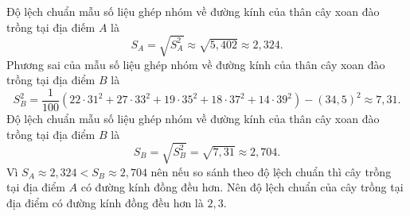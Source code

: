 \begin{ex}
{$$		$$
		Độ lệch chuẩn mẫu số liệu ghép nhóm về đường kính của thân cây xoan đào trồng tại địa điếm $A$ là
		$$
		S_A=\sqrt{S_A^2} \approx \sqrt{5{,}402} \approx 2{,}324.
		$$
		Phương sai của mẫu số liệu ghép nhóm về đường kính của thân cây xoan đào trồng tại địa điểm $B$ là
		$$
		S_B^2=\dfrac{1}{100}\left(22 \cdot 31^2+27 \cdot 33^2+19\cdot 35^2+18 \cdot 37^2+14\cdot 39^2\right)-(34{,}5)^2 \approx 7{,}31.
		$$
		Độ lệch chuẩn mẫu số liệu ghép nhóm về đường kính của thân cây xoan đào trồng tại địa điểm $B$ là
		$$
		S_B=\sqrt{S_B^2}=\sqrt{7{,}31} \approx 2{,}704.
		$$
		Vì $S_A\approx 2{,}324< S_B\approx 2{,}704$ nên nếu so sánh theo độ lệch chuẩn thì cây trồng tại địa điểm $A$ có đường kính đồng đều hơn.
		Nên độ lệch chuẩn của cây trồng tại địa điểm có đường kính đồng đều hơn là $2{,}3$.
	}
\end{ex}

